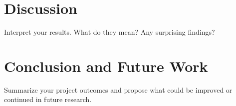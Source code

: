 \documentclass[conference]{IEEEtran}
\begin{document}
\begin{figure}[!ht]
    \centering
\end{figure}

\section{Discussion}
Interpret your results. What do they mean? Any surprising findings?

\section{Conclusion and Future Work}
Summarize your project outcomes and propose what could be improved or continued in future research.
\end{document}
